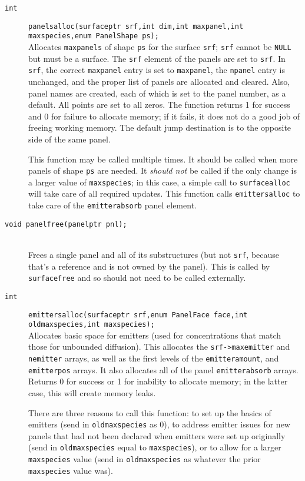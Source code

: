 \documentclass {book}
\begin{document}
\begin{description}
\item[\texttt{int}]
\texttt{panelsalloc(surfaceptr srf,int dim,int maxpanel,int maxspecies,enum PanelShape ps);}
\hfill \\
Allocates \texttt{maxpanels} of shape \texttt{ps} for the surface \texttt{srf}; \texttt{srf} cannot be \texttt{NULL} but must be a surface.  The \texttt{srf} element of the panels are set to \texttt{srf}.  In \texttt{srf}, the correct \texttt{maxpanel} entry is set to \texttt{maxpanel}, the \texttt{npanel} entry is unchanged, and the proper list of panels are allocated and cleared.  Also, panel names are created, each of which is set to the panel number, as a default.  All points are set to all zeros.  The function returns 1 for success and 0 for failure to allocate memory; if it fails, it does not do a good job of freeing working memory.  The default jump destination is to the opposite side of the same panel.

This function may be called multiple times.  It should be called when more panels of shape \texttt{ps} are needed.  It \emph{should not} be called if the only change is a larger value of \texttt{maxspecies}; in this case, a simple call to \texttt{surfacealloc} will take care of all required updates.  This function calls \texttt{emittersalloc} to take care of the \texttt{emitterabsorb} panel element.

\item[\texttt{void panelfree(panelptr pnl);}]
\hfill \\
Frees a single panel and all of its substructures (but not \texttt{srf}, because that's a reference and is not owned by the panel).  This is called by \texttt{surfacefree} and so should not need to be called externally.

\item[\texttt{int}]
\texttt{emittersalloc(surfaceptr srf,enum PanelFace face,int oldmaxspecies,int maxspecies);}
\hfill \\
Allocates basic space for emitters (used for concentrations that match those for unbounded diffusion).  This allocates the \texttt{srf->maxemitter} and \texttt{nemitter} arrays, as well as the first levels of the \texttt{emitteramount}, and \texttt{emitterpos} arrays.  It also allocates all of the panel \texttt{emitterabsorb} arrays.  Returns 0 for success or 1 for inability to allocate memory; in the latter case, this will create memory leaks.

There are three reasons to call this function: to set up the basics of emitters (send in \texttt{oldmaxspecies} as 0), to address emitter issues for new panels that had not been declared when emitters were set up originally (send in \texttt{oldmaxspecies} equal to \texttt{maxspecies}), or to allow for a larger \texttt{maxspecies} value (send in \texttt{oldmaxspecies} as whatever the prior \texttt{maxspecies} value was).


\end{description}
\end{document}

